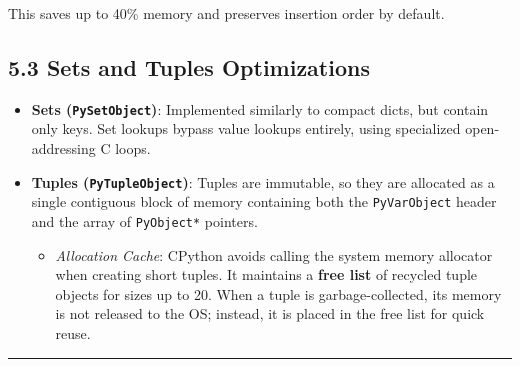 This saves up to 40\% memory and preserves insertion order by default.

\hypertarget{sets-and-tuples-optimizations}{%
\subsection{5.3 Sets and Tuples
Optimizations}\label{sets-and-tuples-optimizations}}

\begin{itemize}
\tightlist
\item
  \textbf{Sets (\passthrough{\lstinline!PySetObject!})}: Implemented
  similarly to compact dicts, but contain only keys. Set lookups bypass
  value lookups entirely, using specialized open-addressing C loops.
\item
  \textbf{Tuples (\passthrough{\lstinline!PyTupleObject!})}: Tuples are
  immutable, so they are allocated as a single contiguous block of
  memory containing both the \passthrough{\lstinline!PyVarObject!}
  header and the array of \passthrough{\lstinline!PyObject*!} pointers.

  \begin{itemize}
  \tightlist
  \item
    \emph{Allocation Cache}: CPython avoids calling the system memory
    allocator when creating short tuples. It maintains a \textbf{free
    list} of recycled tuple objects for sizes up to 20. When a tuple is
    garbage-collected, its memory is not released to the OS; instead, it
    is placed in the free list for quick reuse.
  \end{itemize}
\end{itemize}

\begin{center}\rule{0.5\linewidth}{0.5pt}\end{center}
